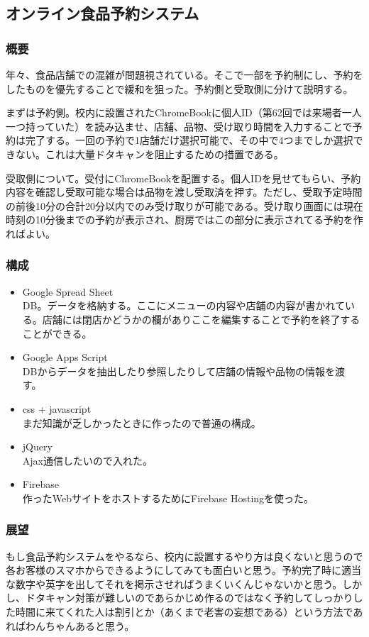 \documentclass[dvipdfmx,jb5]{jarticle}
\begin{document}
 \subsection{オンライン食品予約システム}
 \subsubsection{概要}
 年々、食品店舗での混雑が問題視されている。そこで一部を予約制にし、予約をしたものを優先することで緩和を狙った。予約側と受取側に分けて説明する。

 まずは予約側。校内に設置されたChromeBookに個人ID（第62回では来場者一人一つ持っていた）を読み込ませ、店舗、品物、受け取り時間を入力することで予約は完了する。一回の予約で1店舗だけ選択可能で、その中で4つまでしか選択できない。これは大量ドタキャンを阻止するための措置である。

 受取側について。受付にChromeBookを配置する。個人IDを見せてもらい、予約内容を確認し受取可能な場合は品物を渡し受取済を押す。ただし、受取予定時間の前後10分の合計20分以内でのみ受け取りが可能である。受け取り画面には現在時刻の10分後までの予約が表示され、厨房ではこの部分に表示されてる予約を作ればよい。

 \subsubsection{構成}
 \begin{itemize}
  \item Google Spread Sheet\\
  DB。データを格納する。ここにメニューの内容や店舗の内容が書かれている。店舗には閉店かどうかの欄がありここを編集することで予約を終了することができる。
   \item Google Apps Script\\
   DBからデータを抽出したり参照したりして店舗の情報や品物の情報を渡す。
   \item css + javascript\\
   まだ知識が乏しかったときに作ったので普通の構成。
   \item jQuery\\
   Ajax通信したいので入れた。
   \item Firebase\\
   作ったWebサイトをホストするためにFirebase Hostingを使った。
  \end{itemize}
 \subsubsection{展望}
 もし食品予約システムをやるなら、校内に設置するやり方は良くないと思うので各お客様のスマホからできるようにしてみても面白いと思う。予約完了時に適当な数字や英字を出してそれを掲示させればうまくいくんじゃないかと思う。しかし、ドタキャン対策が難しいのであらかじめ作るのではなく予約してしっかりした時間に来てくれた人は割引とか（あくまで老害の妄想である）という方法であればわんちゃんあると思う。
\end{document}
